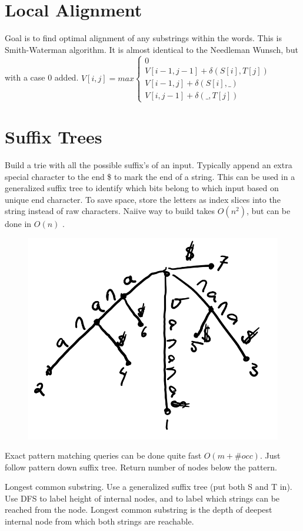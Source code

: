 \documentclass[10pt]{article}
\begin{document}
\section{Local Alignment}
Goal is to find optimal alignment of any substrings within the words.
This is Smith-Waterman algorithm. It is almost identical to the Needleman Wunsch,
but with a case 0 added. $V[i,j] = max \begin{cases}
    0 \\
    V[i-1, j-1] + \delta(S[i], T[j]) \\
    V[i-1, j] + \delta(S[i], \_) \\
    V[i, j-1] + \delta(\_, T[j])
\end{cases}$ 

\section{Suffix Trees}
Build a trie with all the possible suffix's of an input.
Typically append an extra special character to the end \$ to mark the end of a string.
This can be used in a generalized suffix tree to identify which bits belong to which input based on unique end character.
To save space, store the letters as index slices into the string instead of raw characters.
Naiive way to build takes $O(n^2)$, but can be done in $O(n)$ .
\begin{figure}[H] 
    \centering
    \includegraphics[width=0.7 \linewidth]{suffix_tree.png}
\end{figure}


Exact pattern matching queries can be done quite fast $O(m + \# occ)$.
Just follow pattern down suffix tree. Return number of nodes below the pattern.

Longest common substring. Use a generalized suffix tree (put both S and T in).
Use DFS to label height of internal nodes, and to label which strings can be reached from the node.
Longest common substring is the depth of deepest internal node from which both strings are reachable. 
\end{document}

